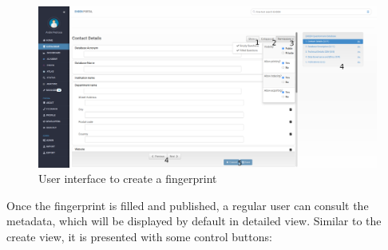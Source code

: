 \begin{figure}[h]
    \center
    \includegraphics[width=\textwidth]{fingerprint-new}
    \caption{User interface to create a fingerprint}
    \label{fig:fingerprint-new}
\end{figure}

Once the fingerprint is filled and published, a regular user can consult the metadata, which will be displayed by default in detailed view.
Similar to the create view, it is presented with some control buttons:

